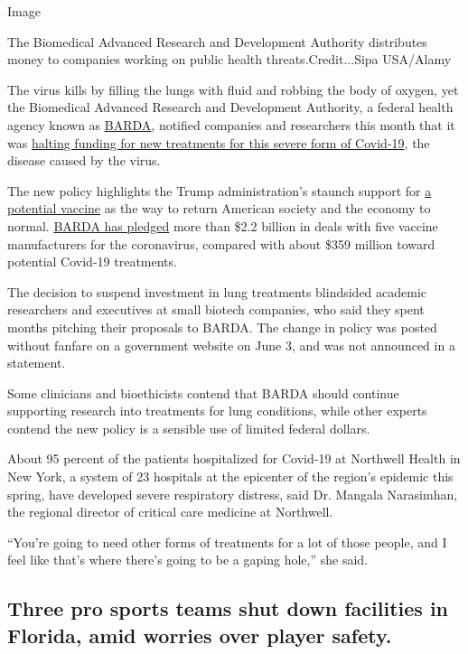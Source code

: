 Image

The Biomedical Advanced Research and Development Authority distributes
money to companies working on public health threats.Credit...Sipa
USA/Alamy

The virus kills by filling the lungs with fluid and robbing the body of
oxygen, yet the Biomedical Advanced Research and Development Authority,
a federal health agency known as
\href{https://medicalcountermeasures.gov/app/barda/coronavirus/COVID19.aspx}{BARDA},
notified companies and researchers this month that it was
\href{https://www.nytimes.com/2020/06/19/health/coronavirus-lung-treatment-funding.html}{halting
funding for new treatments for this severe form of Covid-19}, the
disease caused by the virus.

The new policy highlights the Trump administration's staunch support for
\href{https://www.nytimes.com/2020/05/15/us/politics/coronavirus-vaccine-timeline.html}{a
potential vaccine} as the way to return American society and the economy
to normal.
\href{https://medicalcountermeasures.gov/app/barda/coronavirus/COVID19.aspx}{BARDA
has pledged} more than \$2.2 billion in deals with five vaccine
manufacturers for the coronavirus, compared with about \$359 million
toward potential Covid-19 treatments.

The decision to suspend investment in lung treatments blindsided
academic researchers and executives at small biotech companies, who said
they spent months pitching their proposals to BARDA. The change in
policy was posted without fanfare on a government website on June 3, and
was not announced in a statement.

Some clinicians and bioethicists contend that BARDA should continue
supporting research into treatments for lung conditions, while other
experts contend the new policy is a sensible use of limited federal
dollars.

About 95 percent of the patients hospitalized for Covid-19 at Northwell
Health in New York, a system of 23 hospitals at the epicenter of the
region's epidemic this spring, have developed severe respiratory
distress, said Dr. Mangala Narasimhan, the regional director of critical
care medicine at Northwell.

``You're going to need other forms of treatments for a lot of those
people, and I feel like that's where there's going to be a gaping
hole,'' she said.

\hypertarget{three-pro-sports-teams-shut-down-facilities-in-florida-amid-worries-over-player-safety}{%
\subsection{Three pro sports teams shut down facilities in Florida, amid
worries over player
safety.}\label{three-pro-sports-teams-shut-down-facilities-in-florida-amid-worries-over-player-safety}}

